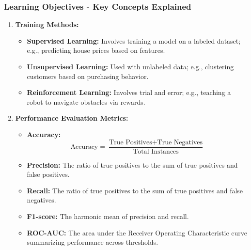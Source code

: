 \documentclass[aspectratio=169]{beamer}
\begin{document}
\begin{frame}[fragile]
    \frametitle{Learning Objectives - Key Concepts Explained}
    \begin{enumerate}
        \item \textbf{Training Methods:}
        \begin{itemize}
            \item \textbf{Supervised Learning:} Involves training a model on a labeled dataset; e.g., predicting house prices based on features.
            \item \textbf{Unsupervised Learning:} Used with unlabeled data; e.g., clustering customers based on purchasing behavior.
            \item \textbf{Reinforcement Learning:} Involves trial and error; e.g., teaching a robot to navigate obstacles via rewards.
        \end{itemize}
        \item \textbf{Performance Evaluation Metrics:}
        \begin{itemize}
            \item \textbf{Accuracy:} 
            \[
            \text{Accuracy} = \frac{\text{True Positives} + \text{True Negatives}}{\text{Total Instances}}
            \]
            \item \textbf{Precision:} The ratio of true positives to the sum of true positives and false positives.
            \item \textbf{Recall:} The ratio of true positives to the sum of true positives and false negatives.
            \item \textbf{F1-score:} The harmonic mean of precision and recall.
            \item \textbf{ROC-AUC:} The area under the Receiver Operating Characteristic curve summarizing performance across thresholds.
        \end{itemize}
    \end{enumerate}
\end{frame}
\end{document}
